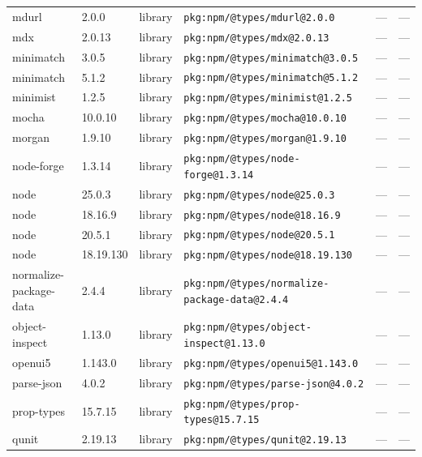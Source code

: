 \documentclass[11pt,a4paper]{article}
\begin{document}
\begin{longtable}{|p{4cm}|p{2cm}|p{1.6cm}|p{5cm}|p{1.5cm}|p{3.5cm}|}
\raggedright mdurl & 2.0.0 & library & \small\texttt{pkg:npm/@types/mdurl@2.0.0} & — & \small — \\
\raggedright mdx & 2.0.13 & library & \small\texttt{pkg:npm/@types/mdx@2.0.13} & — & \small — \\
\raggedright minimatch & 3.0.5 & library & \small\texttt{pkg:npm/@types/minimatch@3.0.5} & — & \small — \\
\raggedright minimatch & 5.1.2 & library & \small\texttt{pkg:npm/@types/minimatch@5.1.2} & — & \small — \\
\raggedright minimist & 1.2.5 & library & \small\texttt{pkg:npm/@types/minimist@1.2.5} & — & \small — \\
\raggedright mocha & 10.0.10 & library & \small\texttt{pkg:npm/@types/mocha@10.0.10} & — & \small — \\
\raggedright morgan & 1.9.10 & library & \small\texttt{pkg:npm/@types/morgan@1.9.10} & — & \small — \\
\raggedright node-forge & 1.3.14 & library & \small\texttt{pkg:npm/@types/node-forge@1.3.14} & — & \small — \\
\raggedright node & 25.0.3 & library & \small\texttt{pkg:npm/@types/node@25.0.3} & — & \small — \\
\raggedright node & 18.16.9 & library & \small\texttt{pkg:npm/@types/node@18.16.9} & — & \small — \\
\raggedright node & 20.5.1 & library & \small\texttt{pkg:npm/@types/node@20.5.1} & — & \small — \\
\raggedright node & 18.19.130 & library & \small\texttt{pkg:npm/@types/node@18.19.130} & — & \small — \\
\raggedright normalize-package-data & 2.4.4 & library & \small\texttt{pkg:npm/@types/normalize-package-data@2.4.4} & — & \small — \\
\raggedright object-inspect & 1.13.0 & library & \small\texttt{pkg:npm/@types/object-inspect@1.13.0} & — & \small — \\
\raggedright openui5 & 1.143.0 & library & \small\texttt{pkg:npm/@types/openui5@1.143.0} & — & \small — \\
\raggedright parse-json & 4.0.2 & library & \small\texttt{pkg:npm/@types/parse-json@4.0.2} & — & \small — \\
\raggedright prop-types & 15.7.15 & library & \small\texttt{pkg:npm/@types/prop-types@15.7.15} & — & \small — \\
\raggedright qunit & 2.19.13 & library & \small\texttt{pkg:npm/@types/qunit@2.19.13} & — & \small — \\

\end{longtable}
\end{document}
